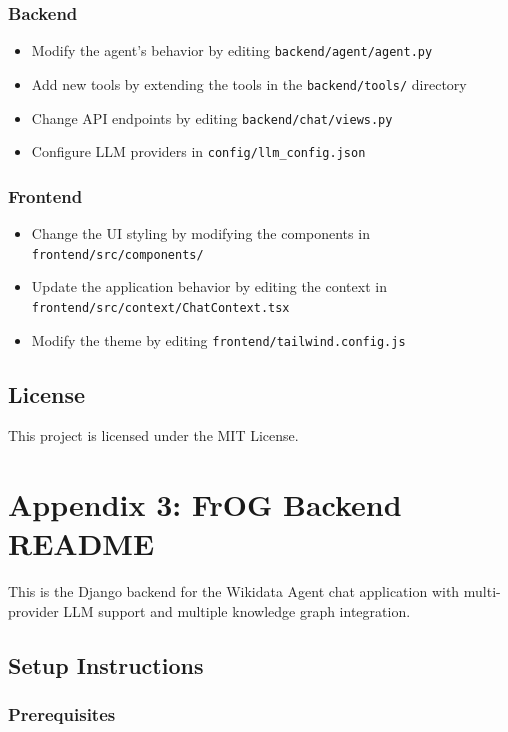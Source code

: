 \subsection*{Backend}
\begin{itemize}
    \item Modify the agent's behavior by editing \texttt{backend/agent/agent.py}
    \item Add new tools by extending the tools in the \texttt{backend/tools/} directory
    \item Change API endpoints by editing \texttt{backend/chat/views.py}
    \item Configure LLM providers in \texttt{config/llm\_config.json}
\end{itemize}

\subsection*{Frontend}
\begin{itemize}
    \item Change the UI styling by modifying the components in \texttt{frontend/src/components/}
    \item Update the application behavior by editing the context in \texttt{frontend/src/context/ChatContext.tsx}
    \item Modify the theme by editing \texttt{frontend/tailwind.config.js}
\end{itemize}

\section*{License}

This project is licensed under the MIT License.

\chapter*{Appendix 3: FrOG Backend README}
\label{sec:frog-backend-readme}

This is the Django backend for the Wikidata Agent chat application with multi-provider LLM support and multiple knowledge graph integration.

\section*{Setup Instructions}

\subsection*{Prerequisites}

